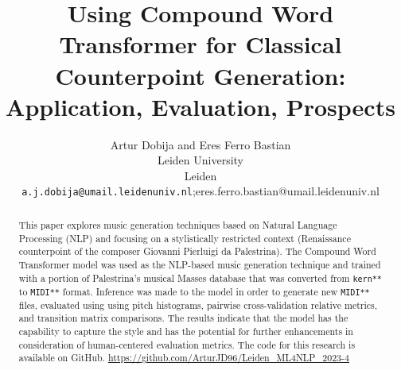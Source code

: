 \documentclass{article}
\title{
Using Compound Word Transformer for Classical Counterpoint Generation: Application, Evaluation, Prospects
}
\author{
  Artur Dobija and Eres Ferro Bastian \\
  Leiden University \\
  Leiden \\
  \texttt{a.j.dobija@umail.leidenuniv.nl};{eres.ferro.bastian@umail.leidenuniv.nl} \\
}
\date{}
\begin{document}
    \maketitle
    \begin{abstract}
    This paper explores music generation techniques based on Natural Language Processing (NLP) and focusing on a stylistically restricted context (Renaissance counterpoint of the composer Giovanni Pierluigi da Palestrina). The Compound Word Transformer model was used as the NLP-based music generation technique and trained with a portion of Palestrina's musical Masses database that was converted from \texttt{kern**} to \texttt{MIDI**} format. Inference was made to the model in order to generate new \texttt{MIDI**} files, evaluated using using pitch histograms, pairwise cross-validation relative metrics, and transition matrix comparisons. The results indicate that the model has the capability to capture the style and has the potential for further enhancements in consideration of human-centered evaluation metrics. The code for this research is available on GitHub. \url{https://github.com/ArturJD96/Leiden_ML4NLP_2023-4}
    \end{abstract}
\end{document}

